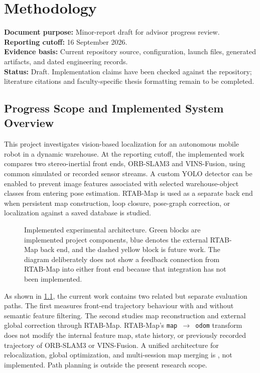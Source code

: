 \chapter{Methodology}
\label{chap:methodology}

\noindent\textbf{Document purpose:} Minor-report draft for advisor progress review.\\
\textbf{Reporting cutoff:} 16 September 2026.\\
\textbf{Evidence basis:} Current repository source, configuration, launch files,
generated artifacts, and dated engineering records.\\
\textbf{Status:} Draft. Implementation claims have been checked against the
repository; literature citations and faculty-specific thesis formatting remain to
be completed.

\section{Progress Scope and Implemented System Overview}
\label{sec:method-overview}

This project investigates vision-based localization for an autonomous mobile
robot in a dynamic warehouse. At the reporting cutoff, the implemented work
compares two stereo-inertial front ends, ORB-SLAM3 and VINS-Fusion, using common
simulated or recorded sensor streams. A custom YOLO detector can be enabled to
prevent image features associated with selected warehouse-object classes from
entering pose estimation. RTAB-Map is used as a separate back end when persistent
map construction, loop closure, pose-graph correction, or localization against a
saved database is studied.

\begin{figure}[htbp]
  \centering
  \resizebox{\textwidth}{!}{}
  \caption{Implemented experimental architecture. Green blocks are implemented
  project components, blue denotes the external RTAB-Map back end, and the dashed
  yellow block is future work. The diagram deliberately does not show a feedback
  connection from RTAB-Map into either front end because that integration has not
  been implemented.}
  \label{fig:system-architecture}
\end{figure}

As shown in \cref{fig:system-architecture}, the current work contains two related
but separate evaluation paths. The first measures front-end trajectory behaviour
with and without semantic feature filtering. The second studies map reconstruction
and external global correction through RTAB-Map. RTAB-Map's
\texttt{map~$\rightarrow$~odom} transform does not modify the internal feature map,
state history, or previously recorded trajectory of ORB-SLAM3 or VINS-Fusion. A
unified architecture for relocalization, global optimization, and multi-session
map merging is , not implemented. Path planning is outside the
present research scope.

